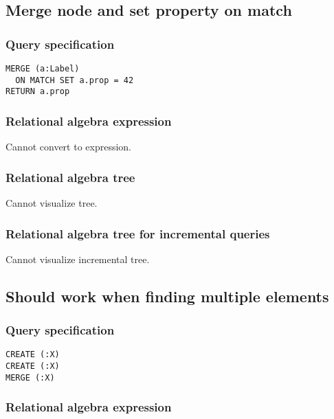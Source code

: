 \subsection{Merge node and set property on match}

\subsubsection*{Query specification}

\begin{lstlisting}
MERGE (a:Label)
  ON MATCH SET a.prop = 42
RETURN a.prop
\end{lstlisting}

\subsubsection*{Relational algebra expression}

Cannot convert to expression.

\subsubsection*{Relational algebra tree}

Cannot visualize tree.

\subsubsection*{Relational algebra tree for incremental queries}

Cannot visualize incremental tree.

\subsection{Should work when finding multiple elements}

\subsubsection*{Query specification}

\begin{lstlisting}
CREATE (:X)
CREATE (:X)
MERGE (:X)
\end{lstlisting}

\subsubsection*{Relational algebra expression}

